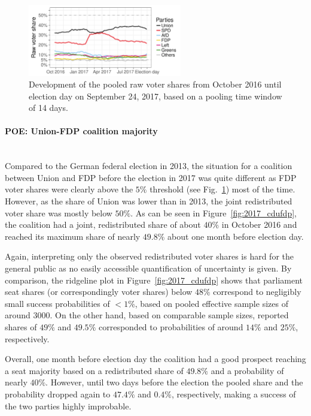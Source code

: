 \documentclass[smallcondensed]{svjour3}     %
\begin{document}
\begin{figure}[H]\centering
\includegraphics[width=0.6\textwidth]{figures/2017_pooled_rawShares.pdf}
\caption{Development of the pooled raw voter shares from October 2016 until
election day on September 24, 2017, based on a pooling time window of 14 days.
\label{fig:2017}
}
\end{figure}


\paragraph{POE: Union-FDP coalition majority} \ \\
Compared to the German federal election in 2013, the situation for a
coalition between Union and FDP before the election in 2017
was quite different as FDP voter shares were
clearly above the $5\%$ threshold (see Fig.~\ref{fig:2017}) most of the time.
However, as the share of Union was lower than in 2013,
the joint redistributed voter share was mostly below $50\%$.
As can be seen in Figure~\ref{fig:2017_cdufdp}, the coalition had
a joint, redistributed share of about $40\%$ in October 2016
and reached its maximum share of nearly $49.8\%$ about one month
before election day.

Again, interpreting only the observed redistributed voter shares
is hard for the general public as no easily accessible quantification
of uncertainty is given. By comparison, the ridgeline plot in Figure~\ref{fig:2017_cdufdp}
shows that parliament seat shares (or correspondingly voter shares)
below $48\%$ correspond to negligibly small success probabilities
of $<1\%$, based on pooled effective sample sizes of around $3000$.
On the other hand, based on comparable sample sizes, reported shares of $49\%$
and $49.5\%$ corresponded to probabilities of around $14\%$ and $25\%$,
respectively.

Overall, one month before election day the coalition had a good prospect
reaching a seat majority based on a redistributed share of $49.8\%$ and
a probability of nearly $40\%$. However, until two days before the election the pooled share and the probability dropped again to $47.4\%$ and $0.4\%$, respectively, making a success
of the two parties highly improbable.
\end{document}
